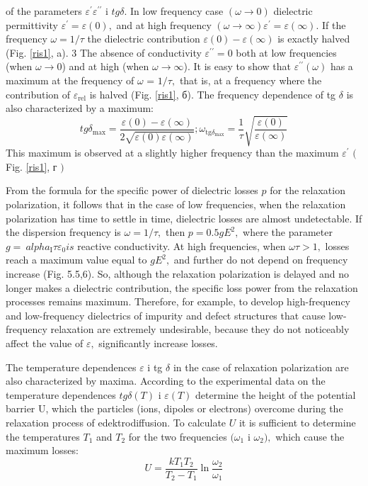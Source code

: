 \documentclass[a4paper,14pt]{extreport}
\begin{document}
of the parameters $ \varepsilon ^ {\prime} \varepsilon ^ {\prime \prime} $ i $  tg \delta. $ In low frequency case $ (\omega \rightarrow 0) $ dielectric permittivity
$ \varepsilon ^ {\prime} = \varepsilon (0), $ and at high frequency $ (\omega \rightarrow \infty) \varepsilon ^ {\prime} = \varepsilon (\infty). $ If the frequency $ \omega = 1 / \tau $
the dielectric contribution $ \varepsilon (0) - \varepsilon (\infty) $ is exactly halved (Fig. \ref{ris1},  a). 3
The absence of conductivity $ \varepsilon ^ {\prime \prime} = 0 $ both at low frequencies (when $ \omega \rightarrow 0 $) and at
high (when $ \omega \rightarrow \infty$). It is easy to show that $ \varepsilon ^ {\prime \prime} (\omega) $ has a maximum at the frequency of  $\omega $ =
$ 1 / \tau, $ that is, at a frequency where the contribution of $ \varepsilon_{\text {rel}} $ is halved (Fig. \ref{ris1},  б).
The frequency dependence of tg $ \delta $ is also characterized by a maximum:
$$
tg \delta_{\mathrm {max}} = \frac{\varepsilon (0) - \varepsilon (\infty)} {2 \sqrt {\varepsilon (0) \varepsilon (\infty)}}; \omega_{\mathrm {tg} \delta_{\mathrm {max}}} = \frac {1} {\tau} \sqrt {\frac {\varepsilon (0)} {\varepsilon (\infty)}}
$$
This maximum is observed at a slightly higher frequency than the maximum $ \varepsilon ^ {\prime} $
$ ($ Fig. \ref{ris1},  г $) $

From the formula for the specific power of dielectric losses $ p $ for the relaxation polarization, it follows that in the case of low frequencies, when the relaxation polarization
has time to settle in time, dielectric losses are almost undetectable. If the dispersion frequency is $ \omega = 1 / \tau, $ then $ p = 0.5 g E^{2}, $ where the parameter $ g = \ alpha_{\mathrm {I}} \tau \varepsilon_ {0} is $
reactive conductivity. At high frequencies, when $ \omega \tau> 1, $ losses reach a maximum value equal to $ g E ^ {2}, $ and further do not depend on frequency increase (Fig. 5.5,6). So, although the relaxation polarization is delayed and no longer makes a dielectric contribution, the specific loss power from the relaxation processes remains maximum. Therefore, for example, to develop
high-frequency and low-frequency dielectrics of impurity and defect
structures that cause low-frequency relaxation are extremely undesirable,
because they do not noticeably affect the value of $ \varepsilon, $ significantly increase
losses.



The temperature dependences $ \varepsilon $ i tg $ \delta $ in the case of relaxation polarization are also characterized by maxima. According to the experimental data on the temperature dependences $tg \delta (T) $ i $\varepsilon (T) $ determine the height of the potential barrier U, which the particles (ions, dipoles or electrons) overcome during the relaxation process of edektrodiffusion. To calculate $ U $ it is sufficient to determine the temperatures $ T_ {1} $ and $ T_ {2} $ for the two frequencies $  (\omega_ {1}
$ i $\omega_ {2} ), $ which cause the maximum losses:
$$
U=\frac{k T_{1} T_{2}}{T_{2}-T_{1}} \ln \frac{\omega_{2}}{\omega_{1}}
$$
\end{document}

